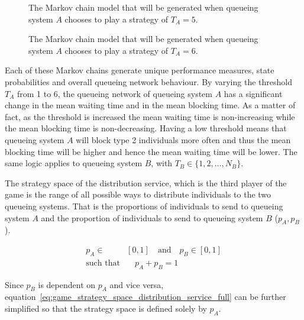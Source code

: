 \begin{figure}[H]
    \centering
    \scalebox{0.8}{
        
    }
    \caption{The Markov chain model that will be generated when queueing system
    \(A\) chooses to play a strategy of \(T_A = 5\).}
\end{figure}

\begin{figure}[H]
    \centering
    \scalebox{0.8}{
        
    }
    \caption{The Markov chain model that will be generated when queueing system
    \(A\) chooses to play a strategy of \(T_A = 6\).}
    \label{fig:game_strategy_visualisation_N_6_M_3_last}
\end{figure}

Each of these Markov chains generate unique performance measures, state
probabilities and overall queueing network behaviour.
By varying the threshold \(T_A\) from 1 to 6, the queueing network of queueing
system \(A\) has a significant change in the mean waiting time and in the mean
blocking time.
As a matter of fact, as the threshold is increased the mean waiting time is
non-increasing while the mean blocking time is non-decreasing.
Having a low threshold means that queueing system \(A\) will block type 2
individuals more often and thus the mean blocking time will be higher and
hence the mean waiting time will be lower.
The same logic applies to queueing system \(B\), with
\(T_B \in \{1, 2, \ldots, N_B\}\).

The strategy space of the distribution service, which is the third player of the
game is the range of all possible ways to distribute individuals to the two
queueing systems.
That is the proportions of individuals to send to queueing system \(A\) and the
proportion of individuals to send to queueing system \(B\) (\(p_A, p_B\)).

\begin{align}
    p_A \in & [0, 1] \quad \text{and} \quad p_B \in [0, 1] \nonumber \\
    \text{such that} & \quad p_A + p_B = 1
    \label{eq:game_strategy_space_distribution_service_full}
\end{align}

Since \(p_B\) is dependent on \(p_A\) and vice versa,
equation~\eqref{eq:game_strategy_space_distribution_service_full} can be further
simplified so that the strategy space is defined solely by \(p_A\).

